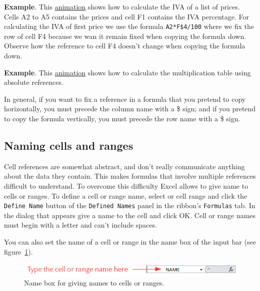 \textbf{Example}. This
\href{http://aprendeconalf.es/office/excel/manual/img/example_copying_formulas_with_absolute_references.gif}{animation} shows how to calculate the IVA of a list of prices. Cells A2 to A5 contains the prices and cell F1 contains the IVA percentage. For calculating the IVA of first price we use the formula \texttt{A2*F\$4/100} where we fix the row of cell F4 because we wan it remain fixed when copying the formula down. Observe how the reference to cell F4 doesn't change when copying the formula down.

\textbf{Example}. This
\href{http://aprendeconalf.es/office/excel/manual/img/example_multiplication_table.gif}{animation} shows how to
calculate the multiplication table using absolute references.

In general, if you want to fix a reference in a formula that you pretend to copy horizontally, you must precede the
column name with a \$ sign; and if you pretend to copy the formula vertically, you must precede the row name with a \$
sign. 

\subsection{Naming cells and ranges}\hypertarget{naming-cells-and-ranges}{}\label{naming-cells-and-ranges}

Cell references are somewhat abstract, and don't really communicate anything about the data they contain. This makes
formulas that involve multiple references difficult to understand. To overcome this difficulty Excel allows to give name
to cells or ranges. To define a cell or range name, select or cell range and click the \texttt{Define Name} button of
the \texttt{Defined Names} panel in the ribbon's \texttt{Formulas} tab. In the dialog that appears give a
name to the cell and click OK. Cell or range names must begin with a letter and can't include spaces.

You can also set the name of a cell or range in the name box of the input bar (see figure~\ref{img-name_box}).

\begin{figure}[htbp]
\begin{center}
\includegraphics[scale=0.7]{../img/name_box.png}
\end{center}
\caption{Name box for giving names to cells or ranges.}
\label{img-name_box}
\end{figure}

